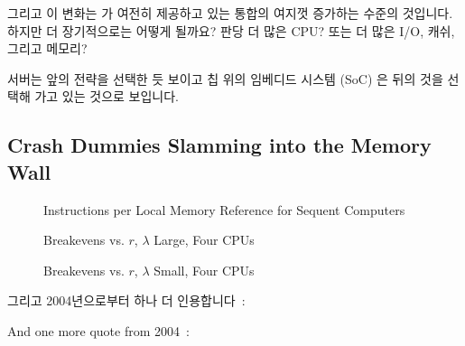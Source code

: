 그리고 이 변화는  가 여전히 제공하고 있는 통합의 여지껏
증가하는 수준의 것입니다.
하지만 더 장기적으로는 어떻게 될까요?
판당 더 많은 CPU?
또는 더 많은 I/O, 캐쉬, 그리고 메모리?

서버는 앞의 전략을 선택한 듯 보이고 칩 위의 임베디드 시스템 (SoC) 은 뒤의 것을
선택해 가고 있는 것으로 보입니다.

\subsection{Crash Dummies Slamming into the Memory Wall}
\label{sec:future:Crash Dummies Slamming into the Memory Wall}

\begin{figure}[tbp]
\centering
\epsfxsize=3in
\caption{Instructions per Local Memory Reference for Sequent Computers}
\label{fig:future:Instructions per Local Memory Reference for Sequent Computers}
\end{figure}

\begin{figure}[htbp]
\centering
\epsfxsize=3in
\caption{Breakevens vs. $r$, $\lambda$ Large, Four CPUs}
\label{fig:future:Breakevens vs. r; lambda Large; Four CPUs}
\end{figure}

\begin{figure}[htbp]
\centering
\epsfxsize=3in
\caption{Breakevens vs. $r$, $\lambda$ Small, Four CPUs}
\label{fig:future:Breakevens vs. r; Worst-Case lambda; Four CPUs}
\end{figure}

그리고 2004년으로부터 하나 더 인용합니다~\cite{PaulEdwardMcKenneyPhD}:

\iffalse

And one more quote from 2004~\cite{PaulEdwardMcKenneyPhD}:


